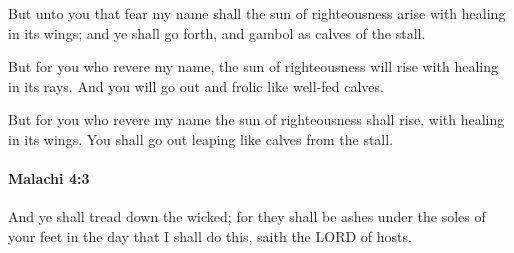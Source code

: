 			\begin{versebox}
					\item[BHS] 
					\item[LXX] 
					\item[ASV] But unto you that fear my name shall the sun of righteousness arise with healing in its wings; and ye shall go forth, and gambol as calves of the stall.
					\item[NIV] But for you who revere my name, the sun of righteousness will rise with healing in its rays. And you will go out and frolic like well-fed calves.
					\item[NRSV] But for you who revere my name the sun of righteousness shall rise, with healing in its wings. You shall go out leaping like calves from the stall.
			\end{versebox}

		\paragraph{Malachi 4:3} %
			\label{MALACHI-4-3}

			And ye shall tread down the wicked; for they shall be ashes under the soles of your feet in the day that I shall do this, saith the LORD of hosts.

